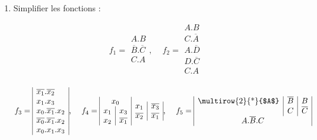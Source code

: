 \begin{enumerate} [label=\arabic*$^\circ$]
\medskip 

\item Simplifier les fonctions :

\medskip

\[ f_1 = 
\begin{array}{|c|}       
	A . B  \\
	\overline{B} . \overline{C} \\
	C . A \\
\end{array} \text{, } 
    \quad f_2 = \begin{array}{|c|} 
    					A . B \\
    					C . \overline{A} \\
    					A . \overline{D} \\
    					D . \overline{C} \\
    					C . A \\
                \end{array}  
\]



\[ f_3 = 
\begin{array}{|l|} 
	 \overline{x_1} . \overline{x_2} \\
	 x_1 . x_3 \\
	 x_0 . \overline{x_1} . x_2 \\
	 \overline{x_0 } . \overline{x_1} . x_2 \\
	 x_0 . x_1 . x_3 \\
\end{array}\text{, } \quad f_4 = \begin{array}{|c|c|} 
								\multicolumn{2}{|c|}{x_0} \\
								x_1 & x_3 \\
								x_2 & \overline{x_1} \\
							\end{array} \begin{array}{c|c|}
											x_1 & \overline{x_3} \\
											\overline{x_2} & \overline{x_1} \\
										 \end{array} \text{, } \quad f_5 = \begin{array}{|c|c|c|} 
										 							  $\multirow{2}{*}{$A$}$ & \overline{B} & B \\
										 							   						& C & \overline{C} \\
										 							   \multicolumn{3}{|c|}{A . \overline{B} . C } 	
										 							\end{array} 
\]


\end{enumerate}
